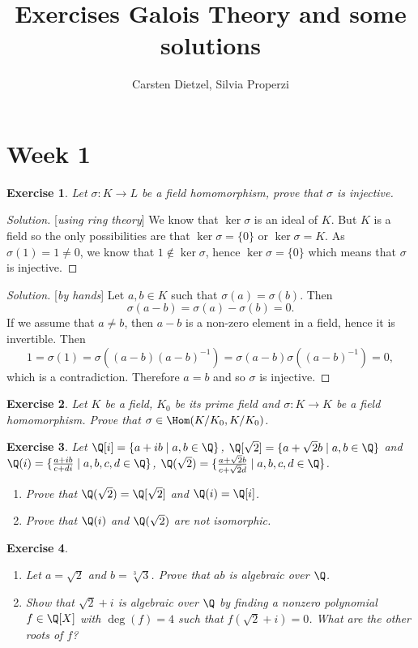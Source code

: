 \documentclass[a4paper,10pt,reqno]{amsart}
\title{Exercises Galois Theory and some solutions}
\author{Carsten Dietzel, Silvia Properzi}
\newtheorem{ex}{Exercise}[section]
\newenvironment{sol}
  {\renewcommand\qedsymbol{$\blacksquare$}\begin{proof}[Solution]}
  {\end{proof}}
\begin{document}
\maketitle
\section{Week 1}


\begin{ex}
    Let $\sigma : K\to L$ be a field homomorphism, prove that $\sigma$ is injective.
\end{ex}
\begin{sol}[\textit{using ring theory}]
    We know that $\ker\sigma$ is an ideal of $K$.
    But $K$ is a field so the only possibilities are that $\ker\sigma=\{0\}$ or $\ker\sigma=K$.
    As $\sigma(1)=1\neq 0$, we know that $1\not\in \ker\sigma$, hence $\ker\sigma=\{0\}$ which means that $\sigma$ is injective.
\end{sol}
\begin{sol}[\textit{by hands}]
    Let $a,b\in K$ such that $\sigma(a)=\sigma(b)$.
    Then 
    \[
    \sigma(a-b)=\sigma(a)-\sigma(b)=0.
    \]
    If we assume that $a\neq b$, then $a-b$ is a non-zero element in a field, hence it is invertible.
    Then 
    \[
    1=\sigma(1)=\sigma((a-b)(a-b)^{-1})=
    \sigma(a-b)\sigma((a-b)^{-1})=0,
    \]
    which is a contradiction.
    Therefore $a=b$ and so $\sigma$ is injective.
\end{sol}

\begin{ex}
    Let $K$ be a field, $K_0$ be its prime field and $\sigma:K\to K$ be a field homomorphism. Prove that $\sigma\in\Hom(K/K_0,K/K_0)$.
\end{ex}


\begin{ex}
Let $\Q[i]=\{a+ib\mid a,b\in \Q\}$, $\Q[\sqrt{2}]=\{a+\sqrt{2}b\mid a,b\in\Q\}$ and $\Q(i)=\{\frac{a+ib}{c+di}\mid a,b,c,d\in \Q\}$, $\Q(\sqrt{2})=\{\frac{a+\sqrt{2}b}{c+\sqrt{2}d}\mid a,b,c,d\in\Q\}$.

\begin{enumerate}[label=(\roman*)]
    \item Prove that $\Q(\sqrt{2})=\Q[\sqrt{2}]$ and $\Q(i)=\Q[i]$.
    \item Prove that $\Q(i)$ and $\Q(\sqrt{2})$ are not isomorphic.
\end{enumerate}
\end{ex}

\begin{ex}~
    \begin{enumerate}[label=(\roman*)]
        \item Let $a=\sqrt{2}$ and $b=\sqrt[3]{3}$. Prove that $ab$ is algebraic over $\Q$.
        \item Show that $\sqrt{2} + i$ is algebraic over $\Q$ by finding a nonzero polynomial $f \in \Q[X]$ with $\deg(f) = 4$ such that $f(\sqrt{2} + i) = 0$. What are the other roots of $f$?
    \end{enumerate}
\end{ex}
\end{document}
